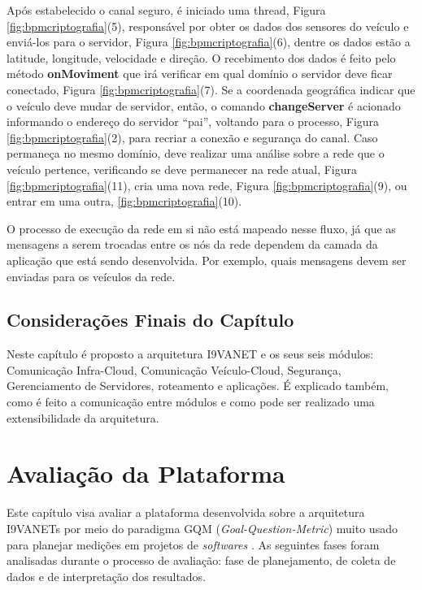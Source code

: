 \documentclass[
	12pt,				%
	oneside,			%
	a4paper,			%
	english,			%
	brazil				%
	]{abntex2ppgsi}
\begin{document}
Após estabelecido o canal seguro, é iniciado uma thread, Figura \ref{fig:bpmcriptografia}(5), responsável por obter os dados dos sensores do veículo e enviá-los para o servidor, Figura \ref{fig:bpmcriptografia}(6), dentre os dados estão a latitude, longitude, velocidade e direção. O recebimento dos dados é feito pelo método \textbf{onMoviment} que irá verificar em qual domínio o servidor deve ficar conectado, Figura \ref{fig:bpmcriptografia}(7). Se a coordenada geográfica indicar que o veículo deve mudar de servidor, então, o comando \textbf{changeServer} é acionado informando o endereço do servidor ``pai'', voltando para o processo, Figura \ref{fig:bpmcriptografia}(2), para recriar a conexão e segurança do canal. Caso permaneça no mesmo domínio, deve realizar uma análise sobre a rede que o veículo pertence, verificando se deve permanecer na rede atual, Figura  \ref{fig:bpmcriptografia}(11), cria uma  nova rede, Figura \ref{fig:bpmcriptografia}(9), ou entrar em uma outra,  \ref{fig:bpmcriptografia}(10).

O processo de execução da rede em si não está mapeado nesse fluxo, já que as mensagens a serem trocadas entre os nós da rede dependem da camada da aplicação que está sendo desenvolvida. Por exemplo,  quais mensagens devem ser enviadas para os veículos da rede.   

\section{Considerações Finais do Capítulo}
Neste capítulo é proposto a arquitetura I9VANET e os seus seis módulos: Comunicação Infra-Cloud, Comunicação Veículo-Cloud, Segurança, Gerenciamento de Servidores, roteamento e aplicações. É explicado também, como é feito a comunicação entre módulos e como pode ser realizado uma extensibilidade da arquitetura.

\chapter{Avaliação da Plataforma}\label{sec:avaliacaoArquitetura}


Este capítulo visa avaliar a plataforma desenvolvida sobre a arquitetura I9VANETs  por meio do paradigma GQM (\textit{Goal-Question-Metric}) muito usado para planejar medições em projetos de \textit{softwares} \cite{van2002goal}. As seguintes fases foram analisadas durante o processo de avaliação: fase de planejamento, de coleta de dados e de interpretação dos resultados.
\end{document}
